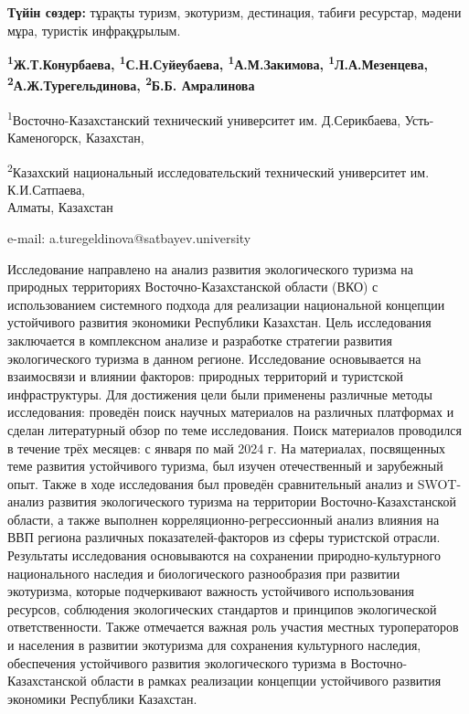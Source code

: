 {\bfseries Түйін сөздер:} тұрақты туризм, экотуризм, дестинация, табиғи
ресурстар, мәдени мұра, туристік инфрақұрылым.


\begin{center}
{\bfseries \textsuperscript{1}Ж.Т.Конурбаева,
\textsuperscript{1}С.Н.Суйеубаева, \textsuperscript{1}А.М.Закимова,
\textsuperscript{1}Л.А.Мезенцева,\\
\textsuperscript{2}А.Ж.Турегельдинова\envelope,
\textsuperscript{2}Б.Б. Амралинова}

\textsuperscript{1}Восточно-Казахстанский технический университет им.
Д.Серикбаева, Усть-Каменогорск, Казахстан,

\textsuperscript{2}Казахский национальный исследовательский технический
университет им. К.И.Сатпаева,\\
Алматы, Казахстан

e-mail: a.turegeldinova@satbayev.university
\end{center}

Исследование направлено на анализ развития экологического туризма на
природных территориях Восточно-Казахстанской области (ВКО) с
использованием системного подхода для реализации национальной концепции
устойчивого развития экономики Республики Казахстан. Цель исследования
заключается в комплексном анализе и разработке стратегии развития
экологического туризма в данном регионе. Исследование основывается на
взаимосвязи и влиянии факторов: природных территорий и туристской
инфраструктуры. Для достижения цели были применены различные методы
исследования: проведён поиск научных материалов на различных платформах
и сделан литературный обзор по теме исследования. Поиск материалов
проводился в течение трёх месяцев: с января по май 2024 г. На
материалах, посвященных теме развития устойчивого туризма, был изучен
отечественный и зарубежный опыт. Также в ходе исследования был проведён
сравнительный анализ и SWOT-анализ развития экологического туризма на
территории Восточно-Казахстанской области, а также выполнен
корреляционно-регрессионный анализ влияния на ВВП региона различных
показателей-факторов из сферы туристской отрасли. Результаты
исследования основываются на сохранении природно-культурного
национального наследия и биологического разнообразия при развитии
экотуризма, которые подчеркивают важность устойчивого использования
ресурсов, соблюдения экологических стандартов и принципов экологической
ответственности. Также отмечается важная роль участия местных
туроператоров и населения в развитии экотуризма для сохранения
культурного наследия, обеспечения устойчивого развития экологического
туризма в Восточно-Казахстанской области в рамках реализации концепции
устойчивого развития экономики Республики Казахстан.

